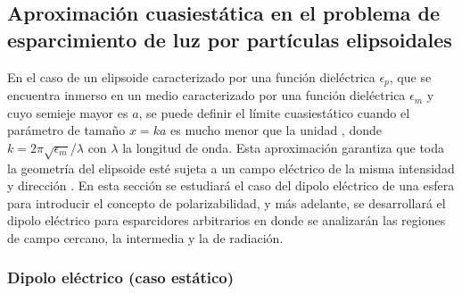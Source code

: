 \subsection{Aproximación cuasiestática en el problema de esparcimiento de luz por partículas elipsoidales}

 En el caso de un elipsoide caracterizado por una función dieléctrica $\epsilon_p$, que se encuentra inmerso en un medio caracterizado por una función dieléctrica $\epsilon_m$ y cuyo semieje mayor es $a$, se puede definir el límite cuasiestático cuando el parámetro de tamaño $x=ka$ es mucho menor que la unidad \cite{Bohren}, donde $k=2\pi \sqrt{\epsilon_m}/\lambda$ con $\lambda$ la longitud de onda. Esta aproximación garantiza que toda la geometría del elipsoide esté sujeta a un campo eléctrico de la misma intensidad y dirección \cite{Miguel}. En esta sección se estudiará el caso del dipolo eléctrico de una esfera para introducir el concepto de polarizabilidad, y más adelante, se desarrollará el dipolo eléctrico para esparcidores arbitrarios en donde se analizarán las regiones de campo cercano, la intermedia y la de radiación.


\subsubsection{Dipolo eléctrico (caso estático)}

